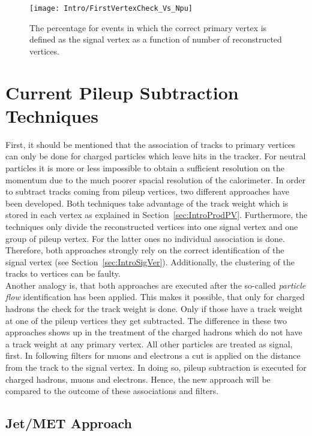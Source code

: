 \begin{figure}[!Hhtb]
  \centering
  \texttt{[image: Intro/FirstVertexCheck\_Vs\_Npu]}
  \caption[Probability to define the correct vertex as signal]{The percentage for events in which the correct primary vertex is defined as the signal vertex as a function of number of reconstructed vertices. \label{plot:IntroSigVertexProb}}
\end{figure}


\section{Current Pileup Subtraction Techniques\label{sec:IntroCurPST}}

First, it should be mentioned that the association of tracks to primary vertices can only be done for charged particles which leave hits in the tracker. For neutral particles it is more or less impossible to obtain a sufficient resolution on the momentum due to the much poorer spacial resolution of the calorimeter. In order to subtract tracks coming from pileup vertices, two different approaches have been developed. Both techniques take advantage of the track weight which is stored in each vertex as explained in Section~\ref{sec:IntroProdPV}. Furthermore, the techniques only divide the reconstructed vertices into one signal vertex and one group of pileup vertex. For the latter ones no individual association is done. Therefore, both approaches strongly rely on the correct identification of the signal vertex (see Section~\ref{sec:IntroSigVer}). Additionally, the clustering of the tracks to vertices can be faulty. \\
Another analogy is, that both approaches are executed after the so-called \textit{particle flow} identification has been applied. This makes it possible, that only for charged hadrons  the check for the track weight is done.  Only if those have a track weight at one of the pileup vertices they get subtracted. The difference in these two approaches shows up in the treatment of the charged hadrons which do not have a track weight at any primary vertex. All other particles are treated as signal, first. In following filters for muons and electrons a cut is applied on the distance from the track to the signal vertex. In doing so, pileup subtraction is executed for charged hadrons, muons and electrons. Hence, the new approach will be compared to the outcome of these associations and filters.

\subsection{Jet/MET Approach \label{sec:IntroJM}}

